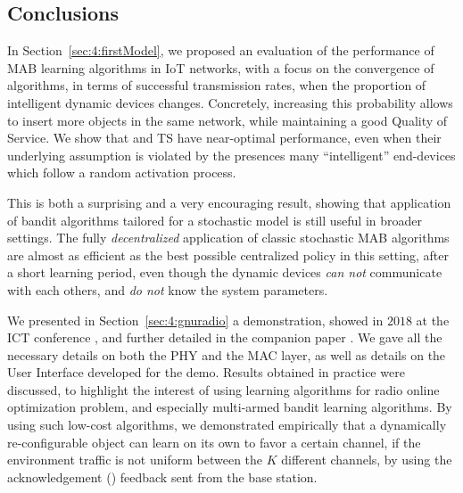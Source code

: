 
\subsection*{Conclusions}

\label{sub:41:conclusion}

In Section~\ref{sec:4:firstModel}, we proposed an evaluation of the performance of MAB learning algorithms in IoT networks,
with a focus on the convergence of algorithms, in terms of successful transmission rates, when the proportion of intelligent dynamic devices changes.
Concretely, increasing this probability allows to insert more objects in the same network, while maintaining a good Quality of Service.
We show that \UCB{} and TS have near-optimal performance, even when their underlying \iid{} assumption is violated by the presences many ``intelligent'' end-devices which follow a random activation process.

This is both a surprising and a very encouraging result, showing that application of bandit algorithms tailored for a stochastic model is still useful in broader settings.
The fully \emph{decentralized} application of classic stochastic MAB algorithms are almost as efficient as the best possible centralized policy in this setting, after a short learning period, even though the dynamic devices \emph{can not} communicate with each others, and \emph{do not} know the system parameters.


\label{sub:42:conclusionFromDemonstration}

We presented in Section~\ref{sec:4:gnuradio} a demonstration, showed in $2018$ at the ICT conference \cite{Besson2018ICT}, and further detailed in the companion paper \cite{Besson2019WCNC}.
We gave all the necessary details on both the PHY and the MAC layer, as well as details on the User Interface developed for the demo.
Results obtained in practice were discussed, to highlight the interest of using learning algorithms for radio online optimization problem, and especially multi-armed bandit learning algorithms.
%
By using such low-cost algorithms, we demonstrated empirically that a dynamically re-configurable object can learn on its own to favor a certain channel, if the environment traffic is not uniform between the $K$ different channels, by using the acknowledgement (\Ack) feedback sent from the base station.


